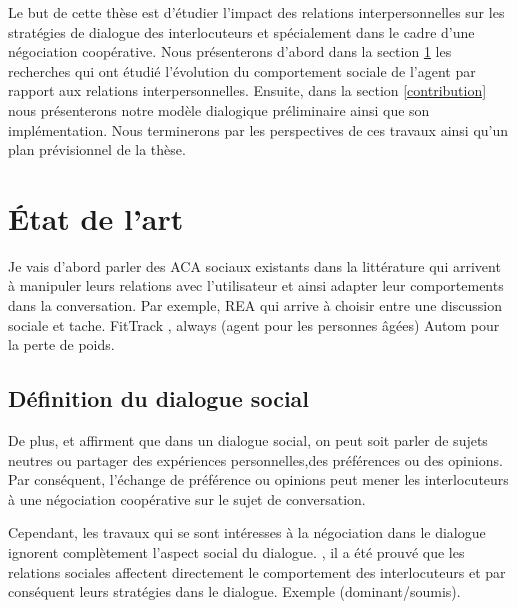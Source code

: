 \documentclass[a4paper,french]{article}
\begin{document}
\par Le but de cette thèse est d'étudier l'impact des relations interpersonnelles sur les stratégies de dialogue des interlocuteurs et spécialement dans le cadre d'une négociation coopérative. Nous présenterons d'abord dans la section \ref{RW} les recherches qui ont étudié l'évolution du comportement sociale de l'agent par rapport aux relations interpersonnelles. Ensuite, dans la section \ref{contribution} nous présenterons notre modèle dialogique préliminaire ainsi que son implémentation. Nous terminerons par les perspectives de ces travaux ainsi qu'un plan prévisionnel de la thèse.

\section{État de l'art}
\label{RW}
Je vais d'abord parler des ACA sociaux existants dans la littérature qui arrivent à manipuler leurs relations avec l'utilisateur et ainsi adapter leur comportements dans la conversation. Par exemple, REA qui arrive à choisir entre une discussion sociale et tache.
FitTrack \cite{bickmore2005s}, always \cite{sidner2013always}(agent pour les personnes âgées)
Autom pour la perte de poids.


\subsection{Définition du dialogue social}

De plus, \cite{bickmore2005social}  et \cite{laver1981linguistic} affirment que dans un dialogue social, on peut soit parler de sujets neutres ou partager des expériences personnelles,des préférences ou des opinions. Par conséquent, l'échange de préférence ou opinions peut mener les interlocuteurs à une négociation coopérative sur le sujet de conversation.



Cependant, les travaux qui se sont intéresses à la négociation \cite{amgoud2000arguments,mcburney2004denotational,daskalopulu1998handling} dans le dialogue ignorent complètement l'aspect social du dialogue. , il a été prouvé que les relations sociales affectent directement le comportement des interlocuteurs \cite{bickmore2000weather, bickmore2005establishing, moon1998intimate, nass2000does} et par conséquent leurs stratégies dans le dialogue. 
Exemple (dominant/soumis). 
\end{document}
